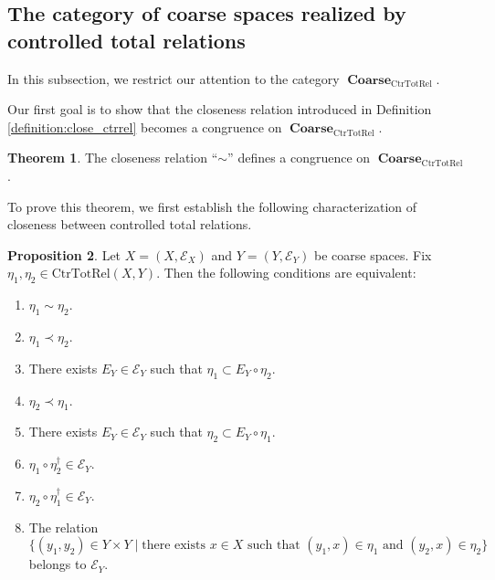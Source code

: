 \documentclass[12pt, a4paper]{amsart}
\theoremstyle{definition}
\newtheorem{theorem}{Theorem}[section]
\newtheorem{proposition}[theorem]{Proposition}
\newcommand{\Coarse}{\mathop{\mathbf{Coarse}}\nolimits}
\newcommand{\CtrTotRel}{\mathrm{CtrTotRel}}
\begin{document}
\subsection{The category of coarse spaces realized by controlled total relations}

In this subsection, we restrict our attention to the category
$\Coarse_{\CtrTotRel}$.

Our first goal is to show that the closeness relation introduced in
Definition \ref{definition:close_ctrrel} becomes a congruence on
$\Coarse_{\CtrTotRel}$.

\begin{theorem}\label{theorem:CtrTot_cong}
The closeness relation ``$\sim$'' defines a congruence on
$\Coarse_{\CtrTotRel}$.
\end{theorem}

To prove this theorem, we first establish the following characterization of
closeness between controlled total relations.

\begin{proposition}\label{proposition:close_on_totalrel}
Let $X=(X,\mathcal{E}_X)$ and $Y=(Y,\mathcal{E}_Y)$ be coarse spaces.
Fix $\eta_1,\eta_2\in\CtrTotRel(X,Y)$.
Then the following conditions are equivalent:
\begin{enumerate}
\item\label{item:close_on_totalrel:equivalent}
$\eta_1\sim\eta_2$.

\item\label{item:close_on_totalrel:eta1-below-eta2}
$\eta_1\prec\eta_2$.

\item\label{item:close_on_totalrel:eta1-contained}
There exists $E_Y\in\mathcal{E}_Y$ such that
$\eta_1\subset E_Y\circ\eta_2$.

\item\label{item:close_on_totalrel:eta2-below-eta1}
$\eta_2\prec\eta_1$.

\item\label{item:close_on_totalrel:eta2-contained}
There exists $E_Y\in\mathcal{E}_Y$ such that
$\eta_2\subset E_Y\circ\eta_1$.

\item\label{item:close_on_totalrel:composite12}
$\eta_1\circ\eta_2^\dagger\in\mathcal{E}_Y$.

\item\label{item:close_on_totalrel:composite21}
$\eta_2\circ\eta_1^\dagger\in\mathcal{E}_Y$.

\item\label{item:close_on_totalrel:witness-relation}
The relation
\[
\{
(y_1,y_2)\in Y\times Y
\mid
\text{there exists }x\in X
\text{ such that }
(y_1,x)\in\eta_1
\text{ and }
(y_2,x)\in\eta_2
\}
\]
belongs to $\mathcal{E}_Y$.
\end{enumerate}
\end{proposition}
\end{document}
